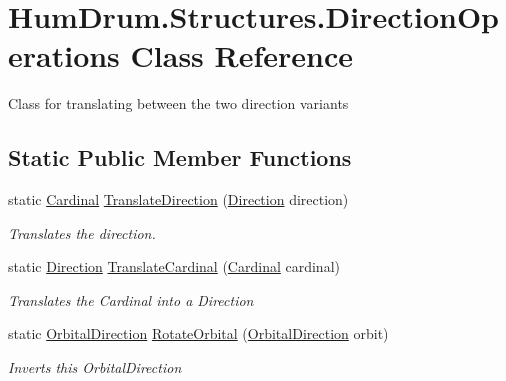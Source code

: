 \hypertarget{classHumDrum_1_1Structures_1_1DirectionOperations}{}\section{Hum\+Drum.\+Structures.\+Direction\+Operations Class Reference}
\label{classHumDrum_1_1Structures_1_1DirectionOperations}


Class for translating between the two direction variants  


\subsection*{Static Public Member Functions}
\begin{DoxyCompactItemize}
\item 
static \hyperlink{namespaceHumDrum_1_1Structures_ac777de8ca588ec37dd8793047a84192a}{Cardinal} \hyperlink{classHumDrum_1_1Structures_1_1DirectionOperations_a1ee6e6a9d8ba26808470b7397c6dbb21}{Translate\+Direction} (\hyperlink{namespaceHumDrum_1_1Structures_a83ca1f04475980cb7e79d471cc746dd3}{Direction} direction)
\begin{DoxyCompactList}\small\item\em Translates the direction. \end{DoxyCompactList}\item 
static \hyperlink{namespaceHumDrum_1_1Structures_a83ca1f04475980cb7e79d471cc746dd3}{Direction} \hyperlink{classHumDrum_1_1Structures_1_1DirectionOperations_a6160deccca7c960b0d741b31ec6ad324}{Translate\+Cardinal} (\hyperlink{namespaceHumDrum_1_1Structures_ac777de8ca588ec37dd8793047a84192a}{Cardinal} cardinal)
\begin{DoxyCompactList}\small\item\em Translates the Cardinal into a Direction \end{DoxyCompactList}\item 
static \hyperlink{namespaceHumDrum_1_1Structures_a1b5e67f976aea8954390bccad43a9c9e}{Orbital\+Direction} \hyperlink{classHumDrum_1_1Structures_1_1DirectionOperations_a39107515f5aa57531524b20a611f3f42}{Rotate\+Orbital} (\hyperlink{namespaceHumDrum_1_1Structures_a1b5e67f976aea8954390bccad43a9c9e}{Orbital\+Direction} orbit)
\begin{DoxyCompactList}\small\item\em Inverts this Orbital\+Direction \end{DoxyCompactList}\item 

\end{DoxyCompactItemize}
